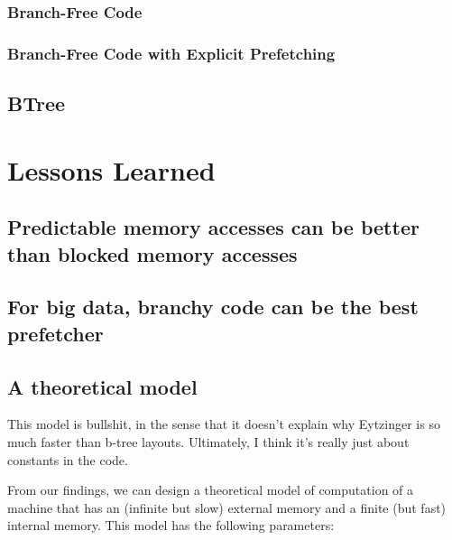\documentclass{patmorin}
\begin{document}
\subsubsection{Branch-Free Code}

\subsubsection{Branch-Free Code with Explicit Prefetching}

\subsection{BTree}





\section{Lessons Learned}

\subsection{Predictable memory accesses can be better than blocked
            memory accesses}

\subsection{For big data, branchy code can be the best prefetcher}

\subsection{A theoretical model}

This model is bullshit, in the sense that it doesn't explain why Eytzinger
is so much faster than b-tree layouts.  Ultimately, I think it's really just about constants in the code.


From our findings, we can design a theoretical model of computation of
a machine that has an (infinite but slow) external memory and a finite
(but fast) internal memory.  This model has the following parameters:
\end{document}
